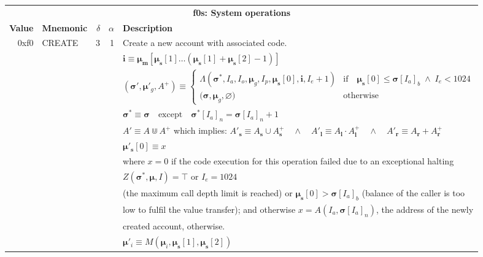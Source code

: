 \documentclass[9pt,oneside]{amsart}
\begin{document}
\begin{tabular*}{\columnwidth}[h]{rlrrl}
\toprule
\multicolumn{5}{c}{\textbf{f0s: System operations}} \vspace{5pt} \\
\textbf{Value} & \textbf{Mnemonic} & $\delta$ & $\alpha$ & \textbf{Description} \vspace{5pt} \\
0xf0 & {\small CREATE} & 3 & 1 & Create a new account with associated code. \\
&&&& $\mathbf{i} \equiv \boldsymbol{\mu}_\mathbf{m}[ \boldsymbol{\mu}_\mathbf{s}[1] \dots (\boldsymbol{\mu}_\mathbf{s}[1] + \boldsymbol{\mu}_\mathbf{s}[2] - 1) ]$ \\
&&&& $(\boldsymbol{\sigma}', \boldsymbol{\mu}'_g, A^+) \equiv \begin{cases}\Lambda(\boldsymbol{\sigma}^*, I_a, I_o, \boldsymbol{\mu}_g, I_p, \boldsymbol{\mu}_\mathbf{s}[0], \mathbf{i}, I_e + 1) & \text{if} \quad \boldsymbol{\mu}_\mathbf{s}[0] \leqslant \boldsymbol{\sigma}[I_a]_b \;\wedge\; I_e < 1024\\ \big(\boldsymbol{\sigma}, \boldsymbol{\mu}_g, \varnothing\big) & \text{otherwise} \end{cases}$ \\
&&&& $\boldsymbol{\sigma}^* \equiv \boldsymbol{\sigma} \quad \text{except} \quad \boldsymbol{\sigma}^*[I_a]_n = \boldsymbol{\sigma}[I_a]_n + 1$ \\
&&&& $A' \equiv A \Cup A^+$ which implies: $A'_\mathbf{s} \equiv A_\mathbf{s} \cup A^+_\mathbf{s} \quad \wedge \quad A'_\mathbf{l} \equiv A_\mathbf{l} \cdot A^+_\mathbf{l} \quad \wedge \quad A'_\mathbf{r} \equiv A_\mathbf{r} + A^+_\mathbf{r}$ \\
&&&& $\boldsymbol{\mu}'_\mathbf{s}[0] \equiv x$ \\
&&&& where $x=0$ if the code execution for this operation failed due to an exceptional halting \\
&&&& $Z(\boldsymbol{\sigma}^*, \boldsymbol{\mu}, I) = \top$ or $I_e = 1024$ \\
&&&& (the maximum call depth limit is reached) or $\boldsymbol{\mu}_\mathbf{s}[0] > \boldsymbol{\sigma}[I_a]_b$ (balance of the caller is too \\
&&&& low to fulfil the value transfer); and otherwise $x=A(I_a, \boldsymbol{\sigma}[I_a]_n)$, the address of the newly \\
&&&& created account, otherwise. \\
&&&& $\boldsymbol{\mu}'_i \equiv M(\boldsymbol{\mu}_i, \boldsymbol{\mu}_\mathbf{s}[1], \boldsymbol{\mu}_\mathbf{s}[2])$ \\

\end{tabular*}
\end{document}
